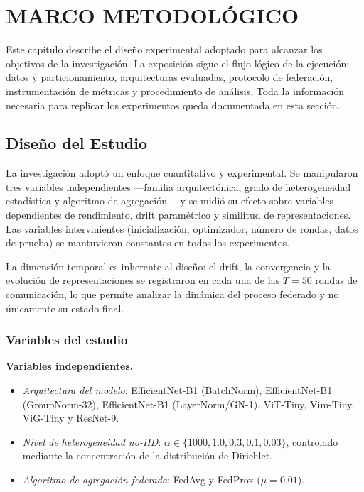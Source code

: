 \chapter{MARCO METODOL\'OGICO}

Este capítulo describe el diseño experimental adoptado para alcanzar los objetivos de la
investigación. La exposición sigue el flujo lógico de la ejecución: datos y particionamiento,
arquitecturas evaluadas, protocolo de federación, instrumentación de métricas y procedimiento
de análisis. Toda la información necesaria para replicar los experimentos queda documentada
en esta sección.

\section{Diseño del Estudio}

La investigación adoptó un enfoque cuantitativo y experimental. Se manipularon tres variables
independientes —familia arquitectónica, grado de heterogeneidad estadística y algoritmo de
agregación— y se midió su efecto sobre variables dependientes de rendimiento, drift paramétrico
y similitud de representaciones. Las variables intervinientes (inicialización, optimizador,
número de rondas, datos de prueba) se mantuvieron constantes en todos los experimentos.

La dimensión temporal es inherente al diseño: el drift, la convergencia y la evolución de
representaciones se registraron en cada una de las $T = 50$ rondas de comunicación, lo que
permite analizar la dinámica del proceso federado y no únicamente su estado final.

\subsection{Variables del estudio}

\textbf{Variables independientes.}
\begin{itemize}
  \item \textit{Arquitectura del modelo}: EfficientNet-B1 (BatchNorm), EfficientNet-B1
    (GroupNorm-32), EfficientNet-B1 (LayerNorm/GN-1), ViT-Tiny, Vim-Tiny, ViG-Tiny y ResNet-9.
  \item \textit{Nivel de heterogeneidad no-IID}: $\alpha \in \{1000, 1.0, 0.3, 0.1, 0.03\}$,
    controlado mediante la concentración de la distribución de Dirichlet.
  \item \textit{Algoritmo de agregación federada}: FedAvg y FedProx ($\mu = 0.01$).
\end{itemize}

